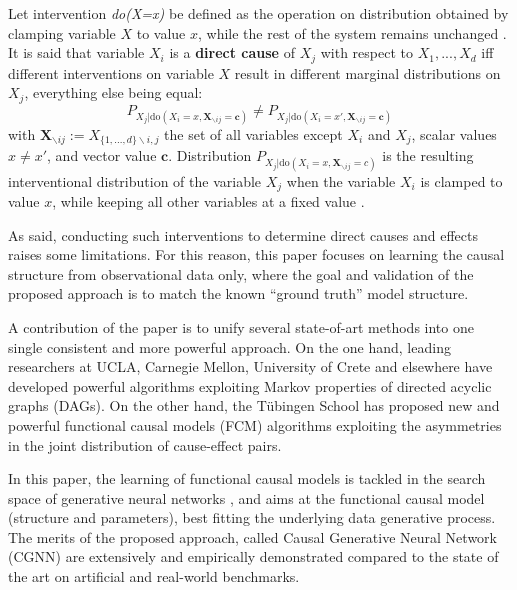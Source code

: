 \documentclass[a4paper, 11pt]{article}
\newcommand{\CG}{CGNN}
\begin{document}
Let intervention \textit{do(X=x)} be defined as the operation on distribution obtained by clamping variable $X$ to value $x$, while the rest of the system remains unchanged \citep{pearl2009causality}. It is said that variable $X_i$ is a \textbf{direct cause} of $X_j$ with respect to $X_1,..., X_d$ iff different interventions on variable $X$ result in different marginal distributions on $X_j$, everything else being equal:
\begin{equation}
P_{X_j | \text{do}(X_i=x,\textbf{X}_{\backslash ij}=\textbf{c})} \neq P_{X_j | \text{do}(X_i=x',\textbf{X}_{\backslash ij}=\textbf{c})}
\end{equation}
with $\textbf{X}_{\backslash ij} :=X_{\{1,...,d\} \backslash i,j}$ the set of all variables except $X_i$ and $X_j$, scalar values 
$x \neq x'$, and vector value $\textbf{c}$.  Distribution $P_{X_j | \text{do}(X_i=x,\textbf{X}_{\backslash ij}=c)}$ is the resulting interventional distribution of the variable $X_j$ when the variable $X_i$ is clamped to value $x$, while keeping all other variables at a fixed value \citep{mooij2016distinguishing}. 

As said, conducting such interventions to determine direct causes and effects raises some limitations. For this reason, this paper focuses on learning the causal structure from observational data only, where the goal and validation of the proposed approach is to match the known ``ground truth'' model structure.

A contribution of the paper is to unify several state-of-art methods into one single consistent and more powerful approach. On the one hand, leading researchers at UCLA, Carnegie Mellon, University of Crete
 and elsewhere have developed powerful algorithms exploiting Markov properties of directed acyclic graphs (DAGs). \citep{spirtes2000causation,tsamardinos2006max,pearl2009causality} On the other hand, the T\"ubingen School has proposed new and powerful functional causal models (FCM) algorithms exploiting the asymmetries in the joint distribution of cause-effect pairs. \citep{hoyer2009nonlinear,stegle2010probabilistic,daniusis2012inferring,mooij2016distinguishing} 

In this paper, the learning of functional causal models is tackled in the search space of generative neural networks \citep{kingma2013auto,goodfellow2014generative}, and aims at the functional causal model (structure and parameters), best fitting the underlying data generative process. The merits of the proposed approach, called Causal Generative Neural Network (\CG) are extensively and empirically demonstrated compared to the state of the art on artificial and real-world benchmarks.
\end{document}
